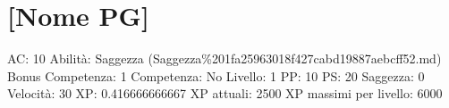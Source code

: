 \section{{[}Nome PG{]}}\label{nome-pg}

AC: 10 Abilità: Saggezza
(Saggezza\%201fa25963018f427cabd19887aebcff52.md) Bonus Competenza: 1
Competenza: No Livello: 1 PP: 10 PS: 20 Saggezza: 0 Velocità: 30 XP:
0.416666666667 XP attuali: 2500 XP massimi per livello: 6000
